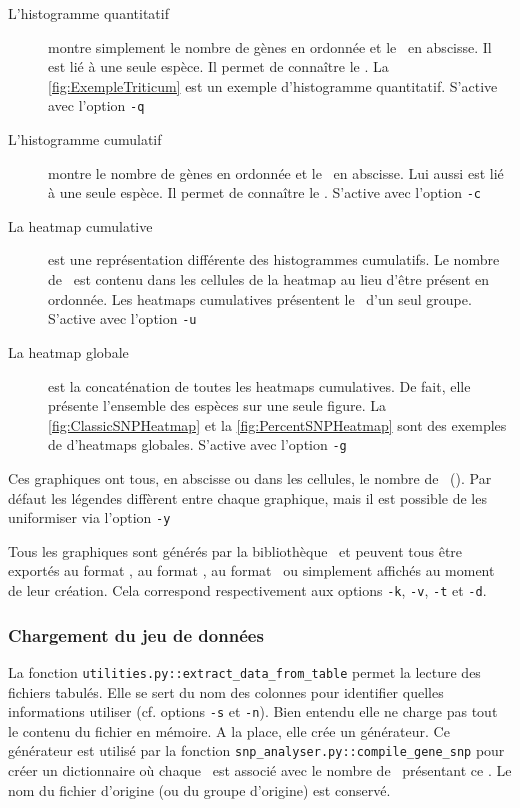 \documentclass[../main]{subfiles} %
\begin{document}
\begin{description}
\item[L'histogramme quantitatif] montre simplement le nombre de gènes en ordonnée et le \NbSNP en abscisse.  Il est lié à une seule espèce. Il permet de connaître le  \GNSPeq. La \cref{fig:ExempleTriticum} est un exemple d'histogramme quantitatif. S'active avec l'option  \lstinline{-q}

\item[L'histogramme cumulatif] montre le nombre de gènes en ordonnée et le \NbSNP en abscisse. Lui aussi est lié à une seule espèce. Il permet de connaître le \GNSPge. 
S'active avec l'option  \lstinline{-c}
\item[La heatmap cumulative] est une représentation différente des histogrammes cumulatifs. Le nombre de \contigs est contenu dans les cellules de la heatmap au lieu d’être présent en ordonnée. Les heatmaps cumulatives présentent le \GNSPge d’un seul groupe. S'active avec l'option  \lstinline{-u}

\item [La heatmap globale] est la concaténation de toutes les heatmaps cumulatives. De fait, elle présente l’ensemble des espèces sur une seule figure. La \cref{fig:ClassicSNPHeatmap} et la \cref{fig:PercentSNPHeatmap} sont des exemples de  d'heatmaps globales. S'active avec l'option  \lstinline{-g}

\end{description}

Ces graphiques ont tous, en abscisse ou dans les cellules, le nombre de \SNP (\NbSNP). Par défaut les légendes diffèrent entre chaque graphique, mais il est possible de les uniformiser via l’option \lstinline{-y}

Tous les graphiques sont générés par la bibliothèque \MatPlotLib et peuvent tous être exportés au format \png, au format 
\svg, au format \tsv ou simplement affichés au moment de leur création. Cela correspond respectivement aux options \lstinline{-k}, \lstinline{-v}, \lstinline{-t} et \lstinline{-d}. 

\subsubsection{Chargement du jeu de données}
La fonction \lstinline{utilities.py::extract_data_from_table} permet la lecture des fichiers tabulés. Elle se sert du nom des colonnes pour identifier quelles informations utiliser (cf. options \lstinline{-s} et \lstinline{-n}). Bien entendu elle ne charge pas tout le contenu du fichier en mémoire. A la place, elle crée un générateur. Ce générateur est utilisé par la fonction \lstinline{snp_analyser.py::compile_gene_snp} pour créer un dictionnaire où chaque \NbSNP est associé avec le nombre de \contigs présentant ce \NbSNP. Le nom du fichier d’origine (ou du groupe d’origine) est conservé. 
\end{document}
